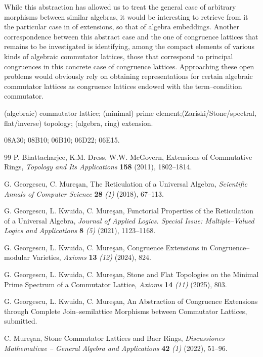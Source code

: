 \documentclass[a4paper]{article} %
\begin{document}
While this abstraction has allowed us to treat the general case of arbitrary morphisms between similar algebras, it would be interesting to retrieve from it the particular case in \cite{cgext} of extensions, so that of algebra embeddings. Another correspondence between this abstract case and the one of congruence lattices that remains to be investigated is identifying, among the compact elements of various kinds of algebraic commutator lattices, those that correspond to principal congruences in this concrete case of congruence lattices. Approaching these open problems would obviously rely on obtaining representations for certain algebraic commutator lattices as congruence lattices endowed with the term--condition commutator.

 (algebraic) commutator lattice; (minimal) prime element;\linebreak (Zariski/Stone/spectral, flat/inverse) topology; (algebra, ring) extension.

 08A30; 08B10; 06B10; 06D22; 06E15.


\begin{thebibliography}{99}
 P. Bhattacharjee, K.M. Dress, W.W. McGovern, Extensions of Commutative Rings, {\em Topology and Its Applications} {\bf 158} (2011), 1802--1814.

 G. Georgescu, C. Mure\c san, The Reticulation of a Universal Algebra, {\em Scientific Annals of Computer Science} {\bf 28} {\em (1)} (2018), 67--113.

 G. Georgescu, L. Kwuida, C. Mure\c san, Functorial Properties of the Reticulation of a Universal Algebra, {\em Journal of Applied Logics. Special Issue: Multiple--Valued Logics and Applications} {\bf 8} {\em (5)} (2021), 1123--1168.

 G. Georgescu, L. Kwuida, C. Mure\c san, Congruence Extensions in Congruence--modular Varieties, {\em Axioms} {\bf 13} {\em (12)} (2024), 824.

 G. Georgescu, L. Kwuida, C. Mure\c san, Stone and Flat Topologies on the Minimal Prime Spectrum of a Commutator Lattice, {\em Axioms} {\bf 14} {\em (11)} (2025), 803.

 G. Georgescu, L. Kwuida, C. Mure\c san, An Abstraction of Congruence Extensions through Complete Join--semilattice Morphisms between Commutator Lattices, submitted.

 C. Mure\c san, Stone Commutator Lattices and Baer Rings, {\em Discussiones Mathematicae -- General Algebra and Applications} {\bf 42} {\em (1)} (2022), 51--96.
\end{thebibliography}
\end{document}
